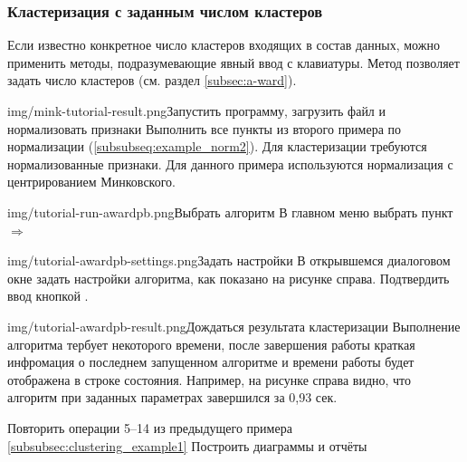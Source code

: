 \documentclass[12pt,tikz]{instruction}
\begin{document}
\newpage
\subsubsection{Кластеризация с заданным числом кластеров}

Если известно конкретное число кластеров входящих в состав данных, можно применить методы, подразумевающие явный ввод с клавиатуры. Метод \AWard позволяет задать число кластеров (см. раздел \ref{subsec:a-ward}).

\begin{steps}
	\begin{ist}{img/mink-tutorial-result.png}{Запустить программу, загрузить файл и нормализовать признаки}
		Выполнить все пункты из второго примера по нормализации (\ref{subsubseq:example_norm2}). Для кластеризации требуются нормализованные признаки. Для данного примера используются нормализация с центрированием Минковского.
	\end{ist}
	\begin{ist}{img/tutorial-run-awardpb.png}{Выбрать алгоритм \AWardpb}
		В главном меню выбрать пункт  $ \Rightarrow $ \menu{\AWardpb}
	\end{ist}
	\begin{ist}{img/tutorial-awardpb-settings.png}{Задать настройки}
		В открывшемся диалоговом окне задать настройки алгоритма, как показано на рисунке справа. Подтвердить ввод кнопкой .\vspace{5cm}
	\end{ist}
	\begin{ist}{img/tutorial-awardpb-result.png}{Дождаться результата кластеризации}
		Выполнение алгоритма тербует некоторого времени, после завершения работы краткая инфромация о последнем запущенном алгоритме и времени работы будет отображена в строке состояния. Например, на рисунке справа видно, что алгоритм \AWardpb при заданных параметрах завершился за 0,93 сек.
	\end{ist}
	\begin{istt}{Повторить операции 5--14 из предыдущего примера \ref{subsubsec:clustering_example1} }{Построить диаграммы и отчёты}
	\end{istt}
	
		
\end{steps}


{} %
\glsaddall

\printglossary[type=\acronymtype,nonumberlist,style=acrostyle]

\newpage
{}
\printglossary[nonumberlist]

\newpage
\nocite{amorim} \nocite{ward} \nocite{boley} \nocite{tasoulis} \nocite{kovaleva} \nocite{mirkin}

\end{document}
